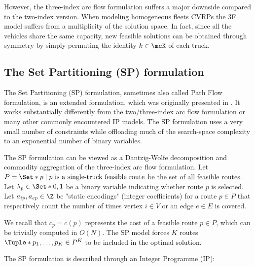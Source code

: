However, the three-index arc flow formulation suffers a major downside compared to the two-index version.
When modeling homogeneous fleets CVRPs the 3F model suffers from a multiplicity of the solution space.
In fact, since all the vehicles share the same capacity,
new feasible solutions can be obtained through symmetry by simply permuting the identity $k \in \mcK$ of each truck.


\subsection{The Set Partitioning (SP) formulation}
\label{sec:intro-set-partition-formulation}

The Set Partitioning (SP) formulation,
sometimes also called Path Flow formulation,
is an extended formulation, which was originally presented in \textcite{balinski1964}.
It works substantially differently from the two/three-index arc flow formulation
or many other commonly encountered IP models.
The SP formulation uses a very small number of constraints
while offloading much of the search-space complexity to an exponential number of binary variables.


The SP formulation can be viewed as a Dantzig-Wolfe decomposition \parencite{dantzig1960}
and commodity aggregation \parencite{desaulniers1998}
of the three-index arc flow formulation.
Let $P = \Set*{p \mid p\ \text{is a single-truck feasible route}}$ be the set of all feasible routes.
Let $\lambda_p \in \Set*{0, 1}$ be a binary variable indicating whether route $p$ is selected.
Let $a_{ip}, a_{ep} \in \Z$ be "static encodings" (integer coefficients)
for a route $p \in P$ that respectively count
the number of times vertex $i \in V$ or an edge $e \in E$ is covered.

We recall that $c_p = c(p)$ represents the cost of a feasible route $p \in P$,
which can be trivially computed in $O(N)$.
The SP model forces $K$ routes $\Tuple*{p_1, \dots, p_K} \in P^K$ to be included in the optimal solution.

The SP formulation is described through an Integer Programme (IP):


